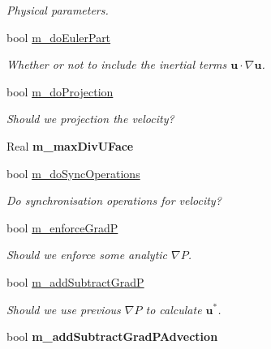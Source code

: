 \begin{DoxyCompactItemize}
\begin{DoxyCompactList}\small\item\em Physical parameters. \end{DoxyCompactList}\item 
\hypertarget{class_a_m_r_level_mushy_layer_aa66b84701e0d54917f5953aace828534}{bool \hyperlink{class_a_m_r_level_mushy_layer_aa66b84701e0d54917f5953aace828534}{m\-\_\-do\-Euler\-Part}}\label{class_a_m_r_level_mushy_layer_aa66b84701e0d54917f5953aace828534}

\begin{DoxyCompactList}\small\item\em Whether or not to include the inertial terms $ \mathbf{u} \cdot \nabla \mathbf{u} $. \end{DoxyCompactList}\item 
\hypertarget{class_a_m_r_level_mushy_layer_ade6864a328f681146317e98f94ec6144}{bool \hyperlink{class_a_m_r_level_mushy_layer_ade6864a328f681146317e98f94ec6144}{m\-\_\-do\-Projection}}\label{class_a_m_r_level_mushy_layer_ade6864a328f681146317e98f94ec6144}

\begin{DoxyCompactList}\small\item\em Should we projection the velocity? \end{DoxyCompactList}\item 
\hypertarget{class_a_m_r_level_mushy_layer_a0e0e8e66ad58ebcf74775a8e799a26b0}{Real {\bfseries m\-\_\-max\-Div\-U\-Face}}\label{class_a_m_r_level_mushy_layer_a0e0e8e66ad58ebcf74775a8e799a26b0}

\item 
\hypertarget{class_a_m_r_level_mushy_layer_a7344a567872638f3663880c52c553ec3}{bool \hyperlink{class_a_m_r_level_mushy_layer_a7344a567872638f3663880c52c553ec3}{m\-\_\-do\-Sync\-Operations}}\label{class_a_m_r_level_mushy_layer_a7344a567872638f3663880c52c553ec3}

\begin{DoxyCompactList}\small\item\em Do synchronisation operations for velocity? \end{DoxyCompactList}\item 
bool \hyperlink{class_a_m_r_level_mushy_layer_a731a16b4dfaecb9235357b88e251af97}{m\-\_\-enforce\-Grad\-P}
\begin{DoxyCompactList}\small\item\em Should we enforce some analytic $ \nabla P $. \end{DoxyCompactList}\item 
bool \hyperlink{class_a_m_r_level_mushy_layer_ae251dc2af22530cbf8a9311a2e83e442}{m\-\_\-add\-Subtract\-Grad\-P}
\begin{DoxyCompactList}\small\item\em Should we use previous $ \nabla P $ to calculate $ \mathbf{u}^* $. \end{DoxyCompactList}\item 
\hypertarget{class_a_m_r_level_mushy_layer_a40e563bb6e1417ca7bf61987e13603c8}{bool {\bfseries m\-\_\-add\-Subtract\-Grad\-P\-Advection}}\label{class_a_m_r_level_mushy_layer_a40e563bb6e1417ca7bf61987e13603c8}


\end{DoxyCompactItemize}
